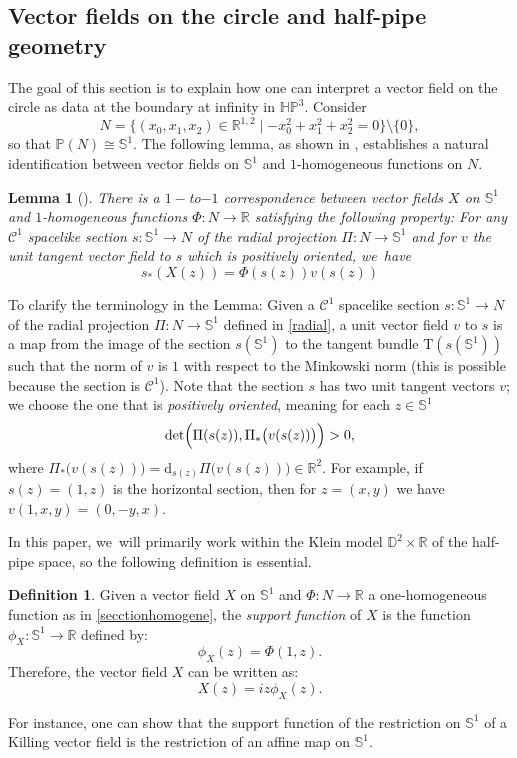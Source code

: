 \documentclass[JEP,XML,SOM,Unicode,NoEqCountersInSection, NoFloatCountersInSection,published]{cedram}
\theoremstyle{plain}
\newtheorem{lemma}[cor]{Lemma}
\theoremstyle{definition}
\newtheorem{defi}[cor]{Definition}
\newcommand{\minko}{\mathbb{R}^{1,2}}
\newcommand{\HP}{\mathbb{HP}^3}
\begin{document}
\subsection{Vector fields on the circle and half-pipe geometry}
The goal of this section is to explain how one can interpret a vector field on the circle as data at the boundary at infinity in $\HP$. Consider
\[
N=\{(x_0,x_1,x_2)\in\minko\mid -x_0^2+x_1^2+x_2^2=0\}\setminus\{0\},\]
so that $\mathbb{P}(N)\cong\mathbb{S}^1$. The following lemma, as shown in \cite{BS17}, establishes a natural identification between vector fields on $\mathbb{S}^1$ and $1$-homogeneous functions on $N$.

\begin{lemma}[{\cite[Lem.\,2.23]{BS17}}]\label{homogene}
There is a $1-$to$-1$ correspondence between vector fields $X$ on $\mathbb{S}^1$ and $1$-homogeneous functions $\Phi:N\to\mathbb{R}$ satisfying the following property: For any $\mathcal{C}^1$ spacelike section $s:\mathbb{S}^1\to N$ of the radial projection $\Pi:N\to\mathbb{S}^1$ and for $v$ the unit tangent vector field to
$s$ which is positively oriented, we~have
\begin{equation}\label{secctionhomogene}
s_*(X(z))=\Phi(s(z))v(s(z))
\end{equation}
\end{lemma}
To clarify the terminology in the Lemma: Given a $\mathcal{C}^1$ spacelike section $s:\mathbb{S}^1\to N$ of the radial projection $\Pi:N\to\mathbb{S}^1$ defined in \eqref{radial}, a unit vector field $v$ to $s$ is a map from the image of the section $s(\mathbb{S}^1)$ to the tangent bundle $\mathrm{T}(s(\mathbb{S}^1))$ such that the norm of $v$ is $1$ with respect to the Minkowski norm (this is possible because the section is $\mathcal{C}^1$). Note that the section $s$ has two unit tangent vectors $v$; we choose the one that is \emph{positively oriented}, meaning for each $z\in \mathbb{S}^1$
\[
\det\Bigl(\Pi(s(z)),\Pi_*\bigl(v(s(z))\bigr)\Bigr)>0,
\]
where $\Pi_*\bigl(v(s(z))\bigr)=\mathrm{d}_{s(z)}\Pi\bigl(v(s(z))\bigr)\in\mathbb{R}^2$. For example, if $s(z)=(1,z)$ is the horizontal section, then for $z=(x,y)$ we have $v(1,x,y)=(0,-y,x)$.

In this paper, we~will primarily work within the Klein model $\mathbb{D}^2\times\mathbb{R}$ of the half-pipe space, so the following definition is essential.

\begin{defi}\label{supportfunction}
Given a vector field $X$ on $\mathbb{S}^1$ and $\Phi:N\to \mathbb{R}$ a one-homogeneous function as in \eqref{secctionhomogene}, the \emph{support function} of $X$ is the function $\phi_X:\mathbb{S}^1\to \mathbb{R}$ defined by:
\[
\phi_X(z)=\Phi(1,z).
\]
Therefore, the vector field $X$ can be written as: \begin{equation}\label{supportfunction_vs_vectorfield}
X(z)=iz\phi_{X}(z).
\end{equation}
\end{defi}
For instance, one can show that the support function of the restriction on $\mathbb{S}^1$ of a Killing vector field is the restriction of an affine map on $\mathbb{S}^1$.
\end{document}
